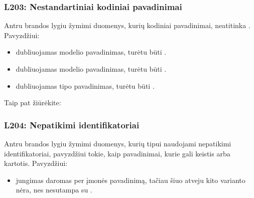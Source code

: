 \documentclass[letterpaper,10pt,lithuanian]{sphinxmanual}
\begin{document}
\subsubsection{L203: Nestandartiniai kodiniai pavadinimai}
\label{\detokenize{branda:l203-nestandartiniai-kodiniai-pavadinimai}}\label{\detokenize{branda:l203}}
\sphinxAtStartPar
Antru brandos lygiu žymimi duomenys, kurių kodiniai pavadinimai, neatitinka
{\hyperref[\detokenize{pavadinimai:kodiniai-pavadinimai}]{}}. Pavyzdžiui:
\begin{itemize}
\item {} 
\sphinxAtStartPar
{} \sphinxhyphen{} dubliuojamas modelio pavadinimas, turėtu būti .

\item {} 
\sphinxAtStartPar
{} \sphinxhyphen{} dubliuojamas modelio pavadinimas, turėtu būti
.

\item {} 
\sphinxAtStartPar
{} \sphinxhyphen{} dubliuojamas tipo pavadinimas, turėtu būti .

\end{itemize}


\begin{sphinxseealso}{Taip pat žiūrėkite:}

\begin{DUlineblock}{0em}
\item[] {\hyperref[\detokenize{pavadinimai:kodiniai-pavadinimai}]{}}
\end{DUlineblock}


\end{sphinxseealso}



\subsubsection{L204: Nepatikimi identifikatoriai}
\label{\detokenize{branda:l204-nepatikimi-identifikatoriai}}\label{\detokenize{branda:l204}}
\sphinxAtStartPar
Antru brandos lygiu žymimi duomenys, kurių  tipui naudojami nepatikimi
identifikatoriai, pavyzdžiui tokie, kaip pavadinimai, kurie gali keistis arba
kartotis. Pavyzdžiui:
\begin{itemize}
\item {} 
\sphinxAtStartPar
{} \sphinxhyphen{} jungimas daromas per įmonės pavadinimą,
tačiau šiuo atveju kito varianto nėra, nes 
nesutampa su .

\end{itemize}
\end{document}
